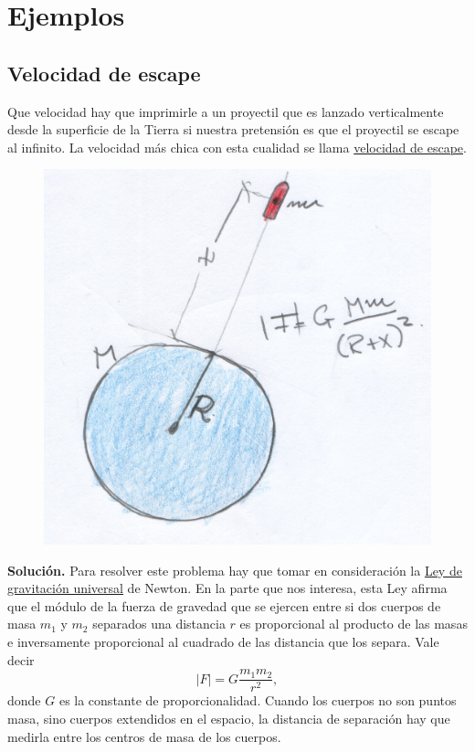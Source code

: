 \section{Ejemplos}


\subsection{Velocidad de escape}\label{pag:vel_esc}



\begin{problema} Que velocidad hay que imprimirle a un proyectil que es lanzado verticalmente desde la superficie de la Tierra si nuestra pretensión
es que el proyectil se escape al infinito. La velocidad más chica con esta cualidad se llama
\href{http://es.wikipedia.org/wiki/Velocidad_de_escape}{velocidad de escape}.
\end{problema}

\begin{figure}
\includegraphics[scale=.075]{imagenes/tiro_vertical.jpg}
\end{figure}
 \noindent\textbf{Solución.} Para resolver este problema hay que tomar en consideración la
\href{http://es.wikipedia.org/wiki/Ley_de_gravitación_universal}{Ley de gravitación universal} de Newton. En la parte que nos interesa, esta Ley afirma
que el módulo de la fuerza de gravedad que se ejercen entre si dos cuerpos de masa $m_1$ y $m_2$ separados una distancia $r$ es proporcional al producto de las masas
e inversamente proporcional al cuadrado de las distancia que los separa. Vale decir
\[|F|=G\frac{m_1m_2}{r^2},\]
donde $G$ es la constante de proporcionalidad.
Cuando los cuerpos no son puntos masa, sino cuerpos extendidos en el espacio, la distancia de separación hay que medirla entre los centros de masa de los cuerpos.



